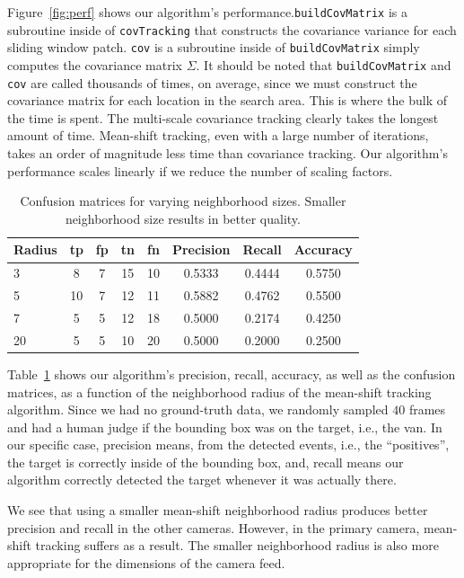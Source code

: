 \documentclass{article}
\begin{document}
Figure~\ref{fig:perf} shows our algorithm's performance.\texttt{buildCovMatrix} is a subroutine inside of \texttt{covTracking} that constructs the covariance variance for each sliding window patch. \texttt{cov} is a subroutine inside of \texttt{buildCovMatrix} simply computes the covariance matrix $\Sigma$. It should be noted that \texttt{buildCovMatrix} and \texttt{cov} are called thousands of times, on average, since we must construct the covariance matrix for each location in the search area. This is where the bulk of the time is spent. The multi-scale covariance tracking clearly takes the longest amount of time. Mean-shift tracking, even with a large number of iterations, takes an order of magnitude less time than covariance tracking. Our algorithm's performance scales linearly if we reduce the number of scaling factors.

\begin{table}[t]
\centering
\begin{tabular}{lccccccc}
\toprule
\textbf{Radius} & \textbf{tp} & \textbf{fp} & \textbf{tn} & \textbf{fn} & \textbf{Precision} & \textbf{Recall} & \textbf{Accuracy} \\
\midrule
3 & 8 & 7 & 15 & 10 & 0.5333 & 0.4444 & 0.5750\\
5 & 10 & 7 & 12 & 11 & 0.5882 & 0.4762 & 0.5500\\
7 & 5 & 5 & 12 & 18 & 0.5000 & 0.2174 & 0.4250\\
20 & 5 & 5 & 10 & 20 & 0.5000 & 0.2000 & 0.2500\\
\bottomrule
\end{tabular}
\caption{Confusion matrices for varying neighborhood sizes. Smaller neighborhood size results in better quality.}\label{fig:accuracy}
\end{table}

Table~\ref{fig:accuracy} shows our algorithm's precision, recall, accuracy, as well as the confusion matrices, as a function of the neighborhood radius of the mean-shift tracking algorithm. Since we had no ground-truth data, we randomly sampled $40$ frames and had a human judge if the bounding box was on the target, i.e., the van. In our specific case, precision means, from the detected events, i.e., the ``positives'', the target is correctly inside of the bounding box, and, recall means our algorithm correctly detected the target whenever it was actually there.

We see that using a smaller mean-shift neighborhood radius produces better precision and recall in the other cameras. However, in the primary camera, mean-shift tracking suffers as a result. The smaller neighborhood radius is also more appropriate for the dimensions of the camera feed.
\end{document}
